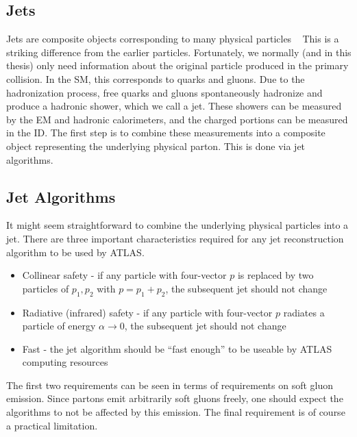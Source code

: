 \subsection{Jets}

Jets are composite objects corresponding to many physical particles ~\cite{Agashe:2014kda,PERF-2011-03,PERF-2012-01}
This is a striking difference from the earlier particles.
Fortunately, we normally (and in this thesis) only need information about the original particle produced in the primary collision.
In the SM, this corresponds to quarks and gluons.
Due to the hadronization process, free quarks and gluons spontaneously hadronize and produce a hadronic shower, which we call a jet.
These showers can be measured by the EM and hadronic calorimeters, and the charged portions can be measured in the ID.
The first step is to combine these measurements into a composite object representing the underlying physical parton.
This is done via jet algorithms.

\subsection{Jet Algorithms}

It might seem straightforward to combine the underlying physical particles into a jet.
There are three important characteristics required for any jet reconstruction algorithm to be used by ATLAS.
\begin{itemize}
\item Collinear safety - if any particle with four-vector $p$ is replaced by two particles of $p_1, p_2$ with $p = p_1 + p_2$, the subsequent jet should not change
\item Radiative (infrared) safety - if any particle with four-vector $p$ radiates a particle of energy $\alpha \rightarrow 0$, the subsequent jet should not change
\item Fast - the jet algorithm should be ``fast enough'' to be useable by ATLAS computing resources
\end{itemize}
The first two requirements can be seen in terms of requirements on soft gluon emission.
Since partons emit arbitrarily soft gluons freely, one should expect the algorithms to not be affected by this emission.
The final requirement is of course a practical limitation.

